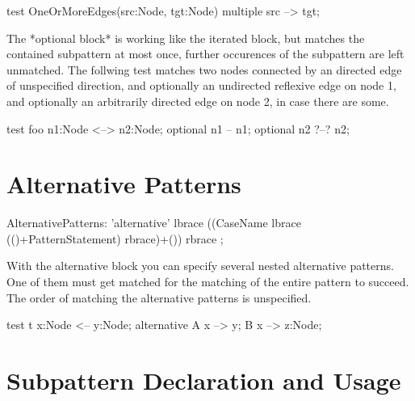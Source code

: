 \begin{example}
  \begin{grgen}
test OneOrMoreEdges(src:Node, tgt:Node)
{
  multiple {
    src --> tgt;
  }
}
  \end{grgen}
\end{example}

The *optional block* is working like the iterated block,
but matches the contained subpattern at most once, 
further occurences of the subpattern are left unmatched.
The follwing test matches two nodes connected by an directed edge
of unspecified direction, and optionally an undirected reflexive edge
on node 1, and optionally an arbitrarily directed edge on node 2,
in case there are some.

\begin{example}
  \begin{grgen}
test foo {
  n1:Node <--> n2:Node;
  optional {
    n1 -- n1;
  }
  optional {
    n2 ?--? n2;
  }
}
  \end{grgen}
\end{example}


\section{Alternative Patterns}
\label{alternative}

\begin{rail}  
  AlternativePatterns: 
    'alternative' lbrace ((CaseName lbrace (()+PatternStatement) rbrace)+()) rbrace
    ;
\end{rail}

With the alternative block you can specify several nested alternative
patterns. One of them must get matched for the matching of the entire pattern
to succeed. The order of matching the alternative patterns is unspecified.

\begin{example}
  \begin{grgen}
test t {
  x:Node <-- y:Node;
  alternative {
    A {
      x --> y;
    }
    B {
      x --> z:Node;
    }
  }
}
  \end{grgen}
\end{example}


\section{Subpattern Declaration and Usage}
\label{subpattern}


